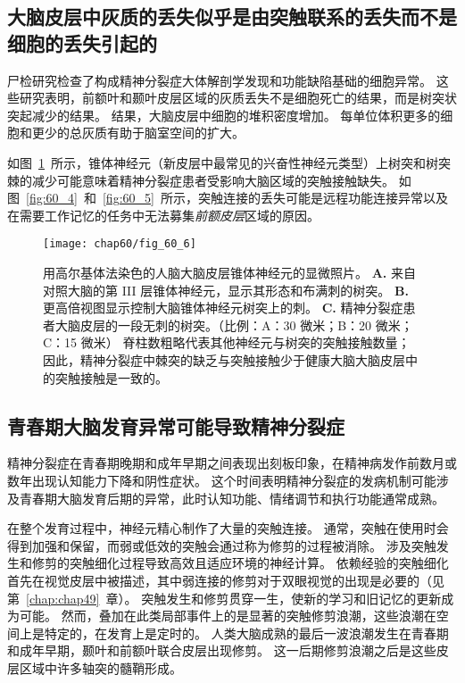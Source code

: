 \subsection{大脑皮层中灰质的丢失似乎是由突触联系的丢失而不是细胞的丢失引起的}

尸检研究检查了构成精神分裂症大体解剖学发现和功能缺陷基础的细胞异常。
这些研究表明，前额叶和颞叶皮层区域的灰质丢失不是细胞死亡的结果，而是树突状突起减少的结果。
结果，大脑皮层中细胞的堆积密度增加。
每单位体积更多的细胞和更少的总灰质有助于脑室空间的扩大。


如图~\ref{fig:60_6}~所示，锥体神经元（新皮层中最常见的兴奋性神经元类型）上树突和树突棘的减少可能意味着精神分裂症患者受影响大脑区域的突触接触缺失。
如图~\ref{fig:60_4}~和~\ref{fig:60_5}~所示，突触连接的丢失可能是远程功能连接异常以及在需要工作记忆的任务中无法募集\textit{前额皮层}区域的原因。


\begin{figure}[htbp]
	\centering
	\texttt{[image: chap60/fig\_60\_6]}
	\caption{用高尔基体法染色的人脑大脑皮层锥体神经元的显微照片。
		\textbf{A.} 来自对照大脑的第 III 层锥体神经元，显示其形态和布满刺的树突。
		\textbf{B.} 更高倍视图显示控制大脑锥体神经元树突上的刺。
		\textbf{C.} 精神分裂症患者大脑皮层的一段无刺的树突。（比例：A：30 微米；B：20 微米；C：15 微米）
		脊柱数粗略代表其他神经元与树突的突触接触数量；
		因此，精神分裂症中棘突的缺乏与突触接触少于健康大脑大脑皮层中的突触接触是一致的\cite{garey1998reduced}。}
	\label{fig:60_6}
\end{figure}



\subsection{青春期大脑发育异常可能导致精神分裂症}

精神分裂症在青春期晚期和成年早期之间表现出刻板印象，在精神病发作前数月或数年出现认知能力下降和阴性症状。
这个时间表明精神分裂症的发病机制可能涉及青春期大脑发育后期的异常，此时认知功能、情绪调节和执行功能通常成熟。


在整个发育过程中，神经元精心制作了大量的突触连接。
通常，突触在使用时会得到加强和保留，而弱或低效的突触会通过称为修剪的过程被消除。
涉及突触发生和修剪的突触细化过程导致高效且适应环境的神经计算。
依赖经验的突触细化首先在视觉皮层中被描述，其中弱连接的修剪对于双眼视觉的出现是必要的（见第~\ref{chap:chap49}~章）。
突触发生和修剪贯穿一生，使新的学习和旧记忆的更新成为可能。
然而，叠加在此类局部事件上的是显著的突触修剪浪潮，这些浪潮在空间上是特定的，在发育上是定时的。
人类大脑成熟的最后一波浪潮发生在青春期和成年早期，颞叶和前额叶联合皮层出现修剪。
这一后期修剪浪潮之后是这些皮层区域中许多轴突的髓鞘形成。


